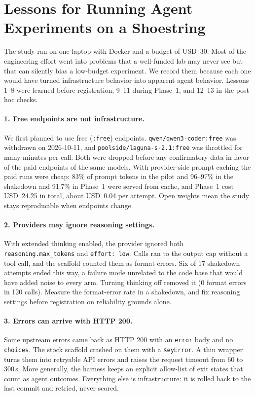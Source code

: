 \documentclass[10pt]{article}
\newcommand{\code}[1]{\texttt{#1}}
\begin{document}
\section{Lessons for Running Agent Experiments on a Shoestring}\label{sec:lessons}

The study ran on one laptop with Docker and a budget of USD~30. Most of the engineering effort
went into problems that a well-funded lab may never see but that can silently bias a low-budget
experiment. We record them because each one would have turned infrastructure behavior into
apparent agent behavior. Lessons 1--8 were learned before registration, 9--11 during Phase~1, and
12--13 in the post-hoc checks.

\paragraph{1. Free endpoints are not infrastructure.} We first planned to use free
(\code{:free}) endpoints. \code{qwen/qwen3-coder:free} was withdrawn on 2026-10-11, and
\code{poolside/laguna-s-2.1:free} was throttled for many minutes per call. Both were dropped
before any confirmatory data in favor of the paid endpoints of the same models. With
provider-side prompt caching the paid runs were cheap: 83\% of prompt tokens in the pilot and
96--97\% in the shakedown and 91.7\% in Phase~1 were served from cache, and Phase~1 cost USD~24.25
in total, about USD~0.04 per attempt.
Open weights mean the study stays reproducible when endpoints change.

\paragraph{2. Providers may ignore reasoning settings.} With extended thinking enabled, the
provider ignored both \code{reasoning.max\_tokens} and \code{effort: low}. Calls ran to the output
cap without a tool call, and the scaffold counted them as format errors. Six of 17 shakedown
attempts ended this way, a failure mode unrelated to the code base that would have added noise to
every arm. Turning thinking off removed it (0 format errors in 120 calls). Measure the format-error
rate in a shakedown, and fix reasoning settings before registration on reliability grounds alone.

\paragraph{3. Errors can arrive with HTTP 200.} Some upstream errors came back as HTTP 200 with
an \code{error} body and no \code{choices}. The stock scaffold crashed on them with a
\code{KeyError}. A thin wrapper turns them into retryable API errors and raises the request
timeout from 60 to 300\,s. More generally, the harness keeps an explicit allow-list of exit states
that count as agent outcomes. Everything else is infrastructure: it is rolled back to the last
commit and retried, never scored.
\end{document}
